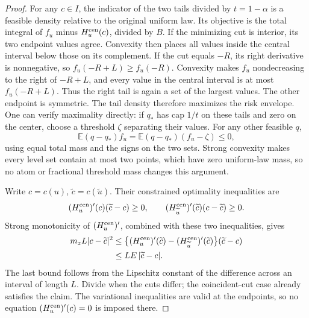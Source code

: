 \begin{proof}
For any \(c\in I\), the indicator of the two tails divided by
\(t=1-\alpha\) is a feasible density relative to the original
uniform law.  Its objective is the total integral of \(f_u\)
minus \(H_u^{\rm cen}(c)\), divided by \(B\).
If the minimizing cut is interior, its two endpoint values agree.
Convexity then places all values inside the central interval below
those on its complement.  If the cut equals \(-R\), its right
derivative is nonnegative, so \(f_u(-R+L)\geq f_u(-R)\).
Convexity makes \(f_u\) nondecreasing to the right of \(-R+L\),
and every value in the central interval is at most
\(f_u(-R+L)\).  Thus the right tail is again a set of the largest
values.  The other endpoint is symmetric.
The tail density therefore maximizes the risk envelope.
One can verify maximality directly: if \(q_*\) has cap \(1/t\)
on these tails and zero on the center, choose a threshold \(\zeta\)
separating their values.  For any other feasible \(q\),
\[
 \mathbb E(q-q_*)f_u
   =\mathbb E(q-q_*)(f_u-\zeta)\leq0,
\]
using equal total mass and the signs on the two sets.
Strong convexity makes every level set contain at most two
points, which have zero uniform-law mass, so no atom or
fractional threshold mass changes this argument.

Write \(c=c(u)\), \(\widetilde c=c(\widetilde u)\).
Their constrained optimality inequalities are
\[
 (H_u^{\rm cen})'(c)(\widetilde c-c)\geq0,\qquad
 (H_{\widetilde u}^{\rm cen})'(\widetilde c)
                                      (c-\widetilde c)\geq0.
\]
Strong monotonicity of \((H_u^{\rm cen})'\), combined with these
two inequalities, gives
\begin{align*}
 m_zL|c-\widetilde c|^2
 &\leq
 \bigl\{(H_u^{\rm cen})'(\widetilde c)
       -(H_{\widetilde u}^{\rm cen})'(\widetilde c)\bigr\}
                                      (\widetilde c-c)\\
 &\leq LE\,|\widetilde c-c|.
\end{align*}
The last bound follows from the Lipschitz constant of the
difference across an interval of length \(L\).  Divide when the
cuts differ; the coincident-cut case already satisfies the
claim.  The variational inequalities are valid at the
endpoints, so no equation \((H_u^{\rm cen})'(c)=0\) is imposed
there.
\end{proof}

